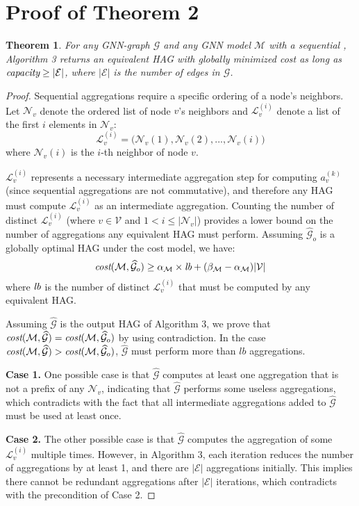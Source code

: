\documentclass{article}
\newcommand{\er}[1]{\mbox{\rm\em #1}}
\newcommand{\xg}{HAG\xspace}
\newcommand{\mw}[1] {\mathcal{\widehat{#1}}}
\newcommand{\m}[1] {\mathcal{#1}}
\newtheorem{theorem}{Theorem}
\begin{document}
\section{Proof of Theorem 2}
\begin{theorem}
\label{thm3}
For any GNN-graph $\m{G}$ and any GNN model $\m{M}$ with a sequential , Algorithm 3 returns an equivalent \xg with globally minimized cost as long as 
$\er{capacity}\geq |\m{E}|$, where $|\m{E}|$ is the number of edges in $\m{G}$.
\end{theorem}
\begin{proof}
Sequential aggregations require a specific ordering of a node's neighbors. Let $\m{N}_v$ denote the ordered list of node $v$'s neighbors and $\m{L}_v^{(i)}$ denote a list of the first $i$ elements in $\m{N}_v$:
$$
\m{L}_v^{(i)} = \big(\m{N}_v(1), \m{N}_v(2), ..., \m{N}_v(i)\big)
$$
where $\m{N}_v(i)$ is the $i$-th neighbor of node $v$.

$\m{L}_v^{(i)}$ represents a necessary intermediate aggregation step for computing $a^{(k)}_v$ (since sequential aggregations are not commutative), and therefore any \xg must compute $\m{L}_v^{(i)}$ as an intermediate aggregation.
Counting the number of distinct $\m{L}_v^{(i)}$ (where $v\in\m{V}$ and $1 < i \leq |\m{N}_v|$) provides a lower bound on the number of aggregations any equivalent \xg must perform. Assuming $\mw{G}_o$ is a globally optimal \xg under the cost model, we have:
$$
\er{cost}(\m{M}, \mw{G}_o) \geq \alpha_{\m{M}} \times \er{lb} + (\beta_{\m{M}} - \alpha_{\m{M}}) |\m{V}|
$$
where $\er{lb}$ is the number of distinct $\m{L}_v^{(i)}$ that must be computed by any equivalent \xg.

Assuming $\mw{G}$ is the output \xg of Algorithm 3, we prove that  $\er{cost}(\m{M}, \mw{G}) = \er{cost}(\m{M}, \mw{G}_o)$ by using contradiction.
In the case $\er{cost}(\m{M}, \mw{G}) > \er{cost}(\m{M}, \mw{G}_o)$, $\mw{G}$ must perform more than $lb$ aggregations. 

{\bf Case 1.} 
One possible case is that $\mw{G}$ computes at least one aggregation that is not a prefix of any $\m{N}_v$, indicating that $\mw{G}$ performs some useless aggregations, which contradicts with the fact that all intermediate aggregations added to $\mw{G}$ must be used at least once.

{\bf Case 2.}
The other possible case is that $\mw{G}$ computes the aggregation of some $\m{L}_v^{(i)}$ multiple times.
However, in Algorithm 3, each iteration reduces the number of aggregations by at least 1, and there are $|\m{E}|$ aggregations initially. 
This implies there cannot be redundant aggregations after $|\m{E}|$ iterations, which contradicts with the precondition of Case 2.
\end{proof}
\end{document}
